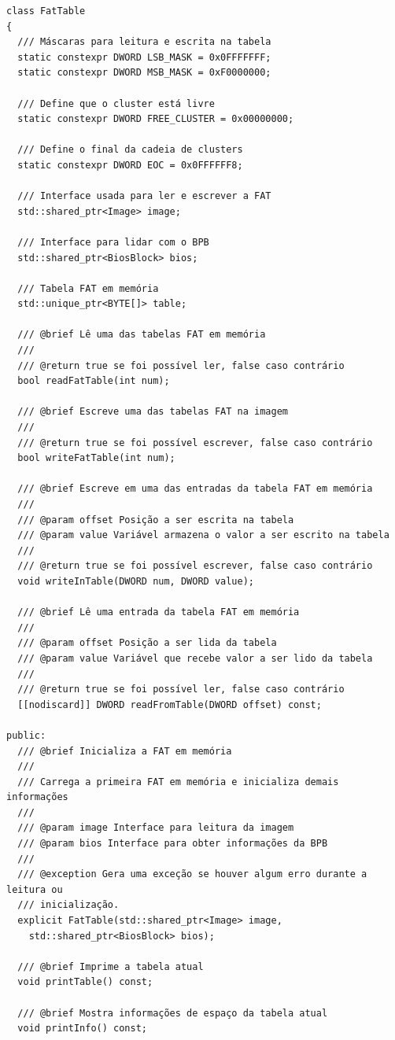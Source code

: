 \documentclass[
    12pt,				%
    oneside,   	        %
    a4paper,			%
    english,			%
    french,				%
    spanish,			%
    brazil,				%
    ]{pacotes/abntex2}
\begin{document}
\begin{lstlisting}[caption={Classe a estrutura FAT}, label={lst:fat_table}]
class FatTable
{
  /// Máscaras para leitura e escrita na tabela
  static constexpr DWORD LSB_MASK = 0x0FFFFFFF;
  static constexpr DWORD MSB_MASK = 0xF0000000;

  /// Define que o cluster está livre
  static constexpr DWORD FREE_CLUSTER = 0x00000000;

  /// Define o final da cadeia de clusters
  static constexpr DWORD EOC = 0x0FFFFFF8;

  /// Interface usada para ler e escrever a FAT
  std::shared_ptr<Image> image;

  /// Interface para lidar com o BPB
  std::shared_ptr<BiosBlock> bios;

  /// Tabela FAT em memória
  std::unique_ptr<BYTE[]> table;

  /// @brief Lê uma das tabelas FAT em memória
  ///
  /// @return true se foi possível ler, false caso contrário
  bool readFatTable(int num);

  /// @brief Escreve uma das tabelas FAT na imagem
  ///
  /// @return true se foi possível escrever, false caso contrário
  bool writeFatTable(int num);

  /// @brief Escreve em uma das entradas da tabela FAT em memória
  ///
  /// @param offset Posição a ser escrita na tabela
  /// @param value Variável armazena o valor a ser escrito na tabela
  ///
  /// @return true se foi possível escrever, false caso contrário
  void writeInTable(DWORD num, DWORD value);

  /// @brief Lê uma entrada da tabela FAT em memória
  ///
  /// @param offset Posição a ser lida da tabela
  /// @param value Variável que recebe valor a ser lido da tabela
  ///
  /// @return true se foi possível ler, false caso contrário
  [[nodiscard]] DWORD readFromTable(DWORD offset) const;

public:
  /// @brief Inicializa a FAT em memória
  ///
  /// Carrega a primeira FAT em memória e inicializa demais informações
  ///
  /// @param image Interface para leitura da imagem
  /// @param bios Interface para obter informações da BPB
  ///
  /// @exception Gera uma exceção se houver algum erro durante a leitura ou
  /// inicialização.
  explicit FatTable(std::shared_ptr<Image> image,
    std::shared_ptr<BiosBlock> bios);

  /// @brief Imprime a tabela atual
  void printTable() const;

  /// @brief Mostra informações de espaço da tabela atual
  void printInfo() const;


\end{lstlisting}
\end{document}
